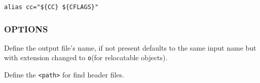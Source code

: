 \begin{lstlisting}[style=bash]
alias cc="${CC} ${CFLAGS}"
\end{lstlisting}

\subsubsection*{OPTIONS}

\begin{description}[style=multiline,leftmargin=5cm]
   \item[\texttt{-o <name>}]
   Define the output file's name,
   if not present defaults to the same input name but with
   extension changed to \texttt{o}(for relocatable objects).
   \item[\texttt{-I <path>}]
   Define the \texttt{<path>} for find header files.
\end{description}
